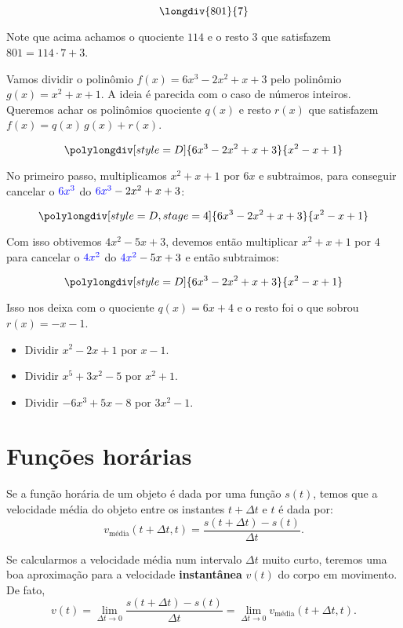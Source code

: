 \documentclass[a4paper,fleqn,12pt]{article}
\begin{document}
$$\longdiv{801}{7}$$

Note que acima achamos o quociente $114$ e o resto $3$ que satisfazem $801 = 114 \cdot 7 + 3$.

\n\n

Vamos dividir o polinômio $f(x) = 6x^3 - 2x^2 + x + 3$ pelo polinômio $g(x) = x^2 + x + 1$. A ideia é parecida com o caso de números inteiros. Queremos achar os polinômios quociente $q(x)$ e resto $r(x)$ que satisfazem $f(x) = q(x) \, g(x) + r(x)$.

$$\polylongdiv[style=D]{6x^3-2x^2+x+3}{x^2-x+1}$$

No primeiro passo, multiplicamos $x^2 + x + 1$ por $\boxed{6x}$ e subtraimos, para conseguir cancelar o $\textcolor{blue}{6x^3}$ do $\textcolor{blue}{6x^3} - 2x^2 + x + 3$:

$$\polylongdiv[style=D, stage=4]{6x^3-2x^2+x+3}{x^2-x+1}$$

Com isso obtivemos $4x^2 - 5x + 3$, devemos então multiplicar $x^2 + x + 1$ por $\boxed{4}$ para cancelar o $\textcolor{blue}{4x^2}$ do $\textcolor{blue}{4x^2} - 5x + 3$ e então subtraimos:

$$\polylongdiv[style=D]{6x^3-2x^2+x+3}{x^2-x+1}$$

Isso nos deixa com o quociente $\boxed{q(x) = 6x + 4}$ e o resto foi o que sobrou $r(x) = - x - 1$.

\begin{itemize}
\item Dividir $x^2 - 2x + 1$ por $x - 1$.
\item Dividir $x^5 + 3x^2 - 5$ por $x^2 + 1$.
\item Dividir $-6x^3 + 5x - 8$ por $3x^2 - 1$.
\end{itemize}


\pagebreak

\section{Funções horárias}

Se a função horária de um objeto é dada por uma função $s(t)$, temos que a velocidade média do objeto entre os instantes $t+\Delta t$ e $t$ é dada por:
$$
v_{\text{média}} (t+\Delta t, t) = \frac{s(t+\Delta t) - s(t)}{\Delta t}.
$$

Se calcularmos a velocidade média num intervalo $\Delta t$ muito curto, teremos uma boa aproximação para a velocidade \textbf{instantânea} $v(t)$ do corpo em movimento. De fato,
$$
v(t) = \lim_{\Delta t \to 0} \frac{s(t+\Delta t) - s(t)}{\Delta t} = \lim_{\Delta t \to 0} v_{\text{média}} (t+\Delta t, t).
$$
\end{document}
